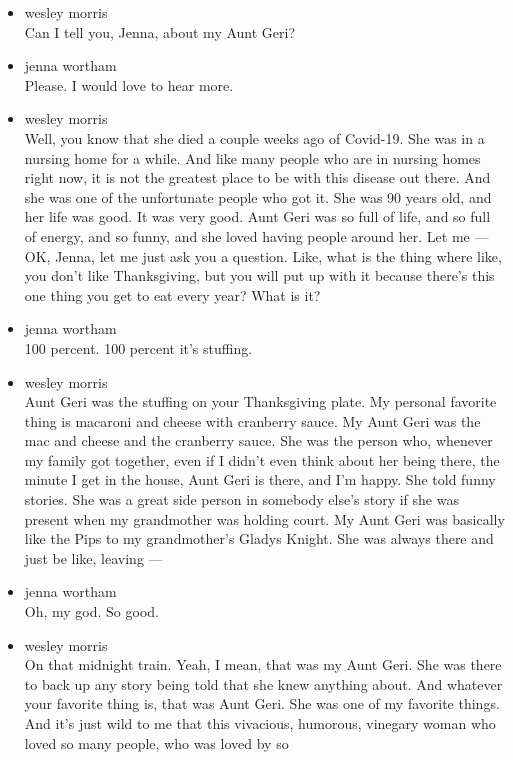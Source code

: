 \begin{itemize}
\item
  wesley morris\\
  Can I tell you, Jenna, about my Aunt Geri?
\item
  jenna wortham\\
  Please. I would love to hear more.
\item
  wesley morris\\
  Well, you know that she died a couple weeks ago of Covid-19. She was
  in a nursing home for a while. And like many people who are in nursing
  homes right now, it is not the greatest place to be with this disease
  out there. And she was one of the unfortunate people who got it. She
  was 90 years old, and her life was good. It was very good. Aunt Geri
  was so full of life, and so full of energy, and so funny, and she
  loved having people around her. Let me --- OK, Jenna, let me just ask
  you a question. Like, what is the thing where like, you don't like
  Thanksgiving, but you will put up with it because there's this one
  thing you get to eat every year? What is it?
\item
  jenna wortham\\
  100 percent. 100 percent it's stuffing.
\item
  wesley morris\\
  Aunt Geri was the stuffing on your Thanksgiving plate. My personal
  favorite thing is macaroni and cheese with cranberry sauce. My Aunt
  Geri was the mac and cheese and the cranberry sauce. She was the
  person who, whenever my family got together, even if I didn't even
  think about her being there, the minute I get in the house, Aunt Geri
  is there, and I'm happy. She told funny stories. She was a great side
  person in somebody else's story if she was present when my grandmother
  was holding court. My Aunt Geri was basically like the Pips to my
  grandmother's Gladys Knight. She was always there and just be like,
  leaving ---
\item
  jenna wortham\\
  Oh, my god. So good.
\item
  wesley morris\\
  On that midnight train. Yeah, I mean, that was my Aunt Geri. She was
  there to back up any story being told that she knew anything about.
  And whatever your favorite thing is, that was Aunt Geri. She was one
  of my favorite things. And it's just wild to me that this vivacious,
  humorous, vinegary woman who loved so many people, who was loved by so

\end{itemize}
